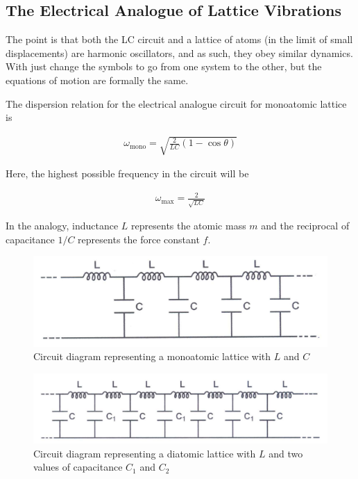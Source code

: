 \subsection{The Electrical Analogue of Lattice Vibrations}
The point is that both the LC circuit and a lattice of atoms (in the limit of small displacements) are harmonic oscillators, and as such, they obey similar dynamics. With just change the symbols to go from one system to the other, but the equations of motion are formally the same.

The dispersion relation for the electrical analogue circuit for monoatomic lattice is

\begin{align}
    \omega_\text{mono} = \sqrt{\frac{2}{LC}(1-\cos \theta)}
\end{align}

Here, the highest possible frequency in the circuit will be 

\begin{align} \label{wf}
    \omega_\text{max} = \frac{2}{\sqrt{LC}}
\end{align}

In the analogy, inductance $L$ represents the atomic mass $m$ and the reciprocal of capacitance $1/C$ represents the force constant $f$.

\begin{figure}[H]
    \centering
    \includegraphics[width=1\columnwidth]{images/circ1.png}
    \caption{Circuit diagram representing a monoatomic lattice with $L$ and $C$}
    \label{c1}
\end{figure}

\begin{figure}[H]
    \centering
    \includegraphics[width=1\columnwidth]{images/circ2.png}
    \caption{Circuit diagram representing a diatomic lattice with $L$ and two values of capacitance $C_1$ and $C_2$}
    \label{c2}
\end{figure}


